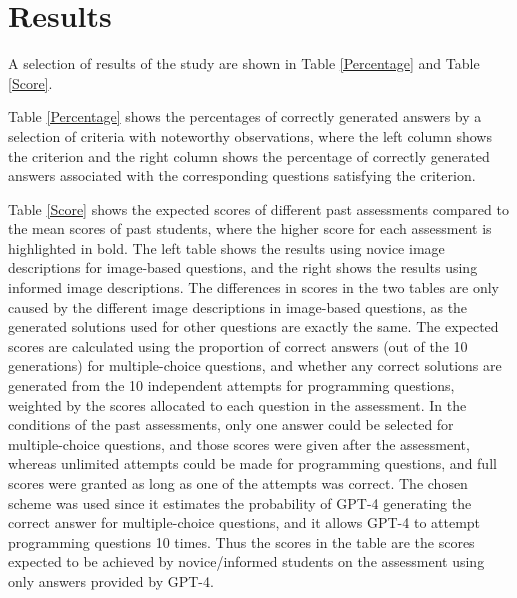 \documentclass[sigconf,authordraft]{acmart}
\begin{document}
\section{Results}
A selection of results of the study are shown in Table \ref{Percentage} and Table \ref{Score}.

Table \ref{Percentage} shows the percentages of correctly generated answers by a selection of criteria with noteworthy observations, where the left column shows the criterion and the right column shows the percentage of correctly generated answers associated with the corresponding questions satisfying the criterion.

Table \ref{Score} shows the expected scores of different past assessments compared to the mean scores of past students, where the higher score for each assessment is highlighted in bold. The left table shows the results using novice image descriptions for image-based questions, and the right shows the results using informed image descriptions. The differences in scores in the two tables are only caused by the different image descriptions in image-based questions, as the generated solutions used for other questions are exactly the same. The expected scores are calculated using the proportion of correct answers (out of the 10 generations) for multiple-choice questions, and whether any correct solutions are generated from the 10 independent attempts for programming questions, weighted by the scores allocated to each question in the assessment. In the conditions of the past assessments, only one answer could be selected for multiple-choice questions, and those scores were given after the assessment, whereas unlimited attempts could be made for programming questions, and full scores were granted as long as one of the attempts was correct. The chosen scheme was used since it estimates the probability of GPT-4 generating the correct answer for multiple-choice questions, and it allows GPT-4 to attempt programming questions 10 times. Thus the scores in the table are the scores expected to be achieved by novice/informed students on the assessment using only answers provided by GPT-4.

\end{document}

